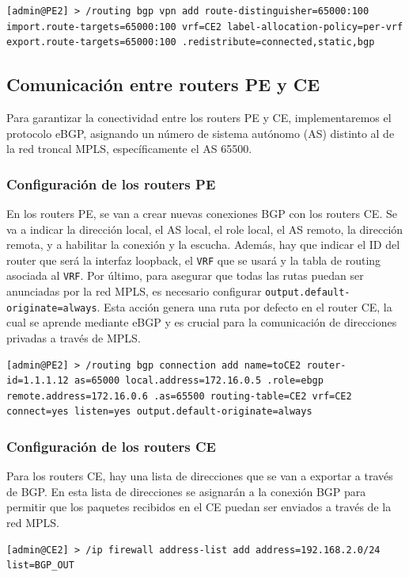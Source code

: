 \begin{lstlisting}[language=RouterOS]
[admin@PE2] > /routing bgp vpn add route-distinguisher=65000:100 import.route-targets=65000:100 vrf=CE2 label-allocation-policy=per-vrf export.route-targets=65000:100 .redistribute=connected,static,bgp
\end{lstlisting}

\subsection{Comunicación entre routers PE y CE}
Para garantizar la conectividad entre los routers PE y CE, implementaremos el protocolo eBGP, asignando un número de sistema autónomo (AS) distinto al de la red troncal MPLS, específicamente el AS 65500.

\subsubsection*{Configuración de los routers PE}
En los routers PE, se van a crear nuevas conexiones BGP con los routers CE. Se va a indicar la dirección local, el AS local, el role local, el AS remoto, la dirección remota, y a habilitar la conexión y la escucha. Además, hay que indicar el ID del router que será la interfaz loopback, el \texttt{VRF} que se usará y la tabla de routing asociada al \texttt{VRF}. Por último, para asegurar que todas las rutas puedan ser anunciadas por la red MPLS, es necesario configurar \texttt{output.default-originate=always}. Esta acción genera una ruta por defecto en el router CE, la cual se aprende mediante eBGP y es crucial para la comunicación de direcciones privadas a través de MPLS.

\begin{lstlisting}[language=RouterOS]
[admin@PE2] > /routing bgp connection add name=toCE2 router-id=1.1.1.12 as=65000 local.address=172.16.0.5 .role=ebgp remote.address=172.16.0.6 .as=65500 routing-table=CE2 vrf=CE2 connect=yes listen=yes output.default-originate=always
\end{lstlisting}

\subsubsection*{Configuración de los routers CE}
Para los routers CE, hay una lista de direcciones que se van a exportar a través de BGP. En esta lista de direcciones se asignarán a la conexión BGP para permitir que los paquetes recibidos en el CE puedan ser enviados a través de la red MPLS.
\begin{lstlisting}[language=RouterOS]
[admin@CE2] > /ip firewall address-list add address=192.168.2.0/24 list=BGP_OUT
\end{lstlisting}

